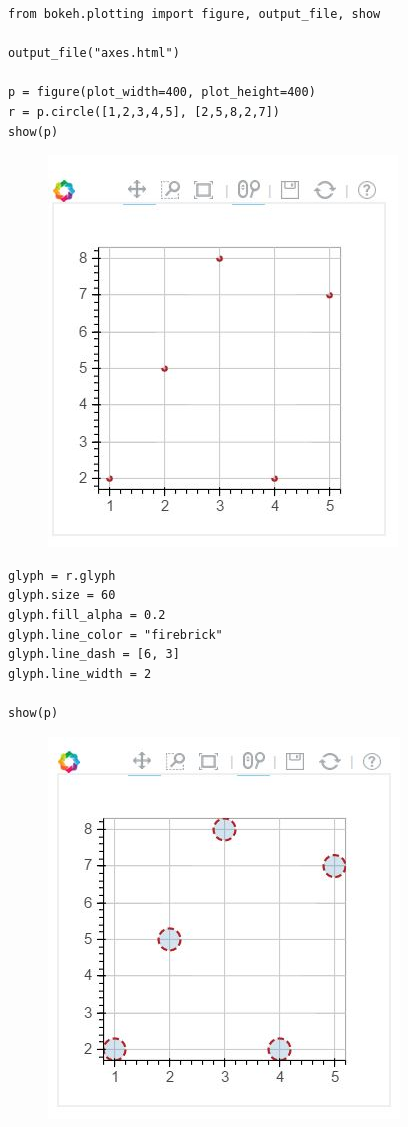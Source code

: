 \documentclass[a4paper,12pt]{article}
\begin{document}
\begin{framed}
\begin{verbatim}
from bokeh.plotting import figure, output_file, show

output_file("axes.html")

p = figure(plot_width=400, plot_height=400)
r = p.circle([1,2,3,4,5], [2,5,8,2,7])
show(p)
\end{verbatim}
\end{framed}
\begin{figure}[h!]
\centering
\includegraphics[width=0.7\linewidth]{images/04-glyphs-01}
\end{figure}
\newpage
\begin{framed}
	\begin{verbatim}
glyph = r.glyph
glyph.size = 60
glyph.fill_alpha = 0.2
glyph.line_color = "firebrick"
glyph.line_dash = [6, 3]
glyph.line_width = 2

show(p)
\end{verbatim}
\end{framed}
\begin{figure}[h!]
	\centering
	\includegraphics[width=0.7\linewidth]{images/04-glyphs-02}
\end{figure}
\newpage
\end{document}
